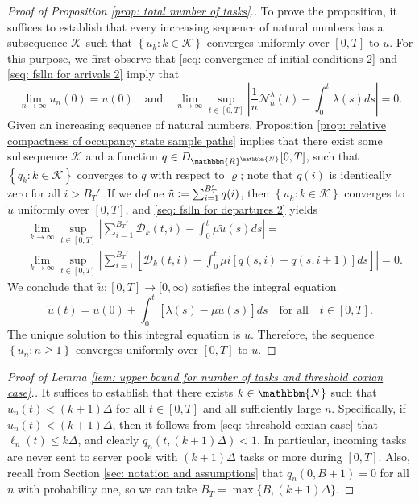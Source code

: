 \documentclass[a4paper, 12pt]{article}
\theoremstyle{definition}
\newcommand{\map}[3]{#1 : #2 \longrightarrow #3}
\newcommand{\set}[2]{\left\{#1 : #2\right\}}
\newcommand{\defeq}{\vcentcolon=}
\newcommand{\calD}{\mathcal{D}}
\newcommand{\calK}{\mathcal{K}}
\newcommand{\calN}{\mathcal{N}}
\newcommand{\N}{\mathbbm{N}}
\newcommand{\R}{\mathbbm{R}}
\begin{document}
\begin{appendices}
\begin{proof}[Proof of Proposition \ref{prop: total number of tasks}.]
	To prove the proposition, it suffices to establish that every increasing sequence of natural numbers has a subsequence $\calK$ such that $\set{u_k}{k \in \calK}$ converges uniformly over $[0, T]$ to $u$. For this purpose, we first observe that \eqref{seq: convergence of initial conditions 2} and \eqref{seq: fslln for arrivals 2} imply that
	\begin{equation*}
		\lim_{n \to \infty} u_n(0) = u(0) \quad \text{and} \quad \lim_{n \to \infty} \sup_{t \in [0, T]} \left|\frac{1}{n}\calN_n^\lambda(t) - \int_0^t \lambda(s)ds\right| = 0.
	\end{equation*}
	Given an increasing sequence of natural numbers, Proposition \ref{prop: relative compactness of occupancy state sample paths} implies that there exist some subsequence $\calK$ and a function $q \in D_{\R^\N}[0, T]$, such that $\set{q_k}{k \in \calK}$ converges to $q$ with respect to $\varrho$; note that $q(i)$ is identically zero for all $i > B_T'$. If we define $\tilde{u} \defeq \sum_{i = 1}^{B_T'} q(i)$, then $\set{u_k}{k \in \calK}$ converges to $\tilde{u}$ uniformly over $[0, T]$, and \eqref{seq: fslln for departures 2} yields
	\begin{align*}
		&\lim_{k \to \infty} \sup_{t \in [0, T]} \left|\sum_{i = 1}^{B_T'} \calD_k(t, i) - \int_0^t \mu \tilde{u}(s)ds\right| = \\
		&\lim_{k \to \infty} \sup_{t \in [0, T]} \left|\sum_{i = 1}^{B_T'} \left[\calD_k(t, i) - \int_0^t \mu i \left[q(s, i) - q(s, i + 1)\right]ds\right]\right| = 0.
	\end{align*}
	We conclude that $\map{\tilde{u}}{[0, T]}{[0, \infty)}$ satisfies the integral equation
	\begin{equation*}
		\tilde{u}(t) = u(0) + \int_0^t \left[\lambda(s) - \mu\tilde{u}(s)\right]ds \quad \text{for all} \quad t \in [0, T].
	\end{equation*}
	The unique solution to this integral equation is $u$. Therefore, the sequence $\set{u_n}{n \geq 1}$ converges uniformly over $[0, T]$ to $u$.
	\end{proof}
	
	\begin{proof}[Proof of Lemma \ref{lem: upper bound for number of tasks and threshold coxian case}.]
	It suffices to establish that there exists $k \in \N$ such that $u_n(t) < (k + 1)\Delta$ for all $t \in [0, T]$ and all sufficiently large $n$. Specifically, if $u_n(t) < (k + 1) \Delta$, then it follows from \eqref{seq: threshold coxian case} that $\ell_n(t) \leq k\Delta$, and clearly $q_n(t, (k + 1)\Delta) < 1$. In particular, incoming tasks are never sent to server pools with $(k + 1) \Delta$ tasks or more during $[0, T]$. Also, recall from Section \ref{sec: notation and assumptions} that $q_n(0, B + 1) = 0$ for all $n$ with probability one, so we can take $B_T = \max \{B, (k + 1)\Delta\}$.
	

\end{proof}
\end{appendices}
\end{document}
